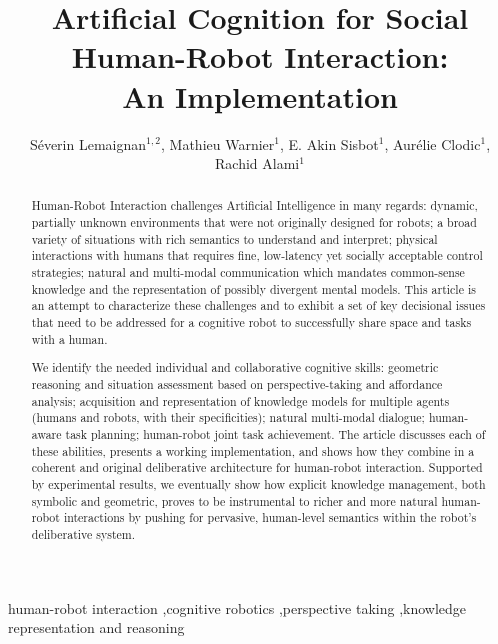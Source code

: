 \documentclass[preprint,3p,times]{elsarticle}
\begin{document}
\begin{frontmatter}

\title{\LARGE \bf
Artificial Cognition for Social Human-Robot Interaction:\\ An Implementation
}

\author{Séverin Lemaignan$^{1,2}$, Mathieu Warnier$^1$, E. Akin Sisbot$^1$,
    Aurélie Clodic$^1$, Rachid Alami$^1$}

\address{
$^1$LAAS-CNRS, Univ. de Toulouse, CNRS\\
7 avenue du Colonel Roche, F-31400 Toulouse, France\\
{\tt firstname.surname@laas.fr}
}

\address{
$^2$Centre for Robotics and Neural Systems\\
Plymouth University, Plymouth, United Kingdom\\
{\tt firstname.surname@plymouth.ac.uk}
}



\begin{abstract}

Human-Robot Interaction challenges Artificial Intelligence in many regards:
dynamic, partially unknown environments that were not originally designed for
robots; a broad variety of situations with rich semantics to understand and
interpret; physical interactions with humans that requires fine, low-latency yet
socially acceptable control strategies; natural and multi-modal communication
which mandates common-sense knowledge and the representation of possibly
divergent mental models. This article is an attempt to characterize these challenges
and to exhibit a set of key decisional issues that need to be addressed for a
cognitive robot to successfully share space and tasks with a human.

We identify the needed individual and collaborative cognitive
skills: geometric reasoning and situation assessment based on perspective-taking
and affordance analysis; acquisition and representation of knowledge models for
multiple agents (humans and robots, with their specificities); natural multi-modal dialogue;
human-aware task planning; human-robot joint task achievement. The article
discusses each of these abilities, presents a working implementation, and shows
how they combine in a coherent and original deliberative architecture for
human-robot interaction. Supported by experimental results, we eventually show
how explicit knowledge management, both symbolic and geometric, proves to be
instrumental to richer and more natural human-robot interactions by pushing for
pervasive, human-level semantics within the robot's deliberative system.

\end{abstract}

\begin{keyword}
    human-robot interaction \sep cognitive robotics \sep perspective taking \sep knowledge representation and reasoning
\end{keyword}

\end{frontmatter}
\end{document}
